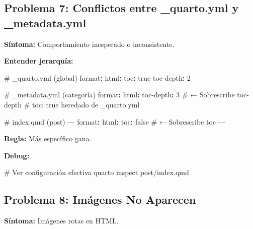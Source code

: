 \documentclass[
  doc,
  floatsintext,
  longtable,
  a4paper,
  nolmodern,
  notxfonts,
  notimes,
  12pt,
  colorlinks=true,linkcolor=blue,citecolor=blue,urlcolor=blue]{apa7}
\newenvironment{Shaded}{\begin{snugshade}}{\end{snugshade}}
\newcommand{\AttributeTok}[1]{\textcolor[rgb]{0.40,0.45,0.13}{#1}}
\newcommand{\CharTok}[1]{\textcolor[rgb]{0.13,0.47,0.30}{#1}}
\newcommand{\CommentTok}[1]{\textcolor[rgb]{0.37,0.37,0.37}{#1}}
\newcommand{\DecValTok}[1]{\textcolor[rgb]{0.68,0.00,0.00}{#1}}
\newcommand{\ExtensionTok}[1]{\textcolor[rgb]{0.00,0.23,0.31}{#1}}
\newcommand{\FunctionTok}[1]{\textcolor[rgb]{0.28,0.35,0.67}{#1}}
\newcommand{\KeywordTok}[1]{\textcolor[rgb]{0.00,0.23,0.31}{\textbf{#1}}}
\newcommand{\NormalTok}[1]{\textcolor[rgb]{0.00,0.23,0.31}{#1}}
\newcommand{\PreprocessorTok}[1]{\textcolor[rgb]{0.68,0.00,0.00}{#1}}
\begin{document}
\subsection{Problema 7: Conflictos entre \_quarto.yml y
\_metadata.yml}\label{problema-7-conflictos-entre-_quarto.yml-y-_metadata.yml}

\textbf{Síntoma:} Comportamiento inesperado o inconsistente.

\textbf{Entender jerarquía:}

\begin{Shaded}
\begin{Highlighting}[]
\CommentTok{\# \_quarto.yml (global)}
\FunctionTok{format}\KeywordTok{:}
\AttributeTok{  }\FunctionTok{html}\KeywordTok{:}
\AttributeTok{    }\FunctionTok{toc}\KeywordTok{:}\AttributeTok{ }\CharTok{true}
\AttributeTok{    }\FunctionTok{toc{-}depth}\KeywordTok{:}\AttributeTok{ }\DecValTok{2}

\CommentTok{\# \_metadata.yml (categoría)}
\FunctionTok{format}\KeywordTok{:}
\AttributeTok{  }\FunctionTok{html}\KeywordTok{:}
\AttributeTok{    }\FunctionTok{toc{-}depth}\KeywordTok{:}\AttributeTok{ }\DecValTok{3}\CommentTok{      \# ← Sobrescribe toc{-}depth}
\CommentTok{    \# toc: true heredado de \_quarto.yml}

\CommentTok{\# index.qmd (post)}
\PreprocessorTok{{-}{-}{-}}
\FunctionTok{format}\KeywordTok{:}
\AttributeTok{  }\FunctionTok{html}\KeywordTok{:}
\AttributeTok{    }\FunctionTok{toc}\KeywordTok{:}\AttributeTok{ }\CharTok{false}\CommentTok{        \# ← Sobrescribe toc}
\PreprocessorTok{{-}{-}{-}}
\end{Highlighting}
\end{Shaded}

\textbf{Regla:} Más específico gana.

\textbf{Debug:}

\begin{Shaded}
\begin{Highlighting}[]
\CommentTok{\# Ver configuración efectiva}
\ExtensionTok{quarto}\NormalTok{ inspect post/index.qmd}
\end{Highlighting}
\end{Shaded}

\subsection{Problema 8: Imágenes No
Aparecen}\label{problema-8-imuxe1genes-no-aparecen}

\textbf{Síntoma:} Imágenes rotas en HTML.
\end{document}
